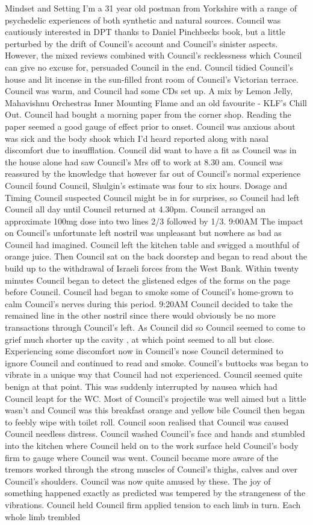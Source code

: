 \documentclass[12pt]{book}
\begin{document}
Mindset and Setting I'm a 31 year old postman from Yorkshire with a range of psychedelic experiences of both synthetic and natural sources. Council was cautiously interested in DPT thanks to Daniel Pinchbecks book, but a little perturbed by the drift of Council's account and Council's sinister aspects. However, the mixed reviews combined with Council's recklessness which Council can give no excuse for, persuaded Council in the end. Council tidied Council's house and lit incense in the sun-filled front room of Council's Victorian terrace. Council was warm, and Council had some CDs set up. A mix by Lemon Jelly, Mahavishnu Orchestras Inner Mounting Flame and an old favourite - KLF's Chill Out. Council had bought a morning paper from the corner shop. Reading the paper seemed a good gauge of effect prior to onset. Council was anxious about was sick and the body shook which I'd heard reported along with nasal discomfort due to insufflation. Council did want to have a fit as Council was in the house alone had saw Council's Mrs off to work at 8.30 am. Council was reassured by the knowledge that however far out of Council's normal experience Council found Council, Shulgin's estimate was four to six hours. Dosage and Timing Council suspected Council might be in for surprises, so Council had left Council all day until Council returned at 4.30pm. Council arranged an approximate 100mg dose into two lines 2/3 followed by 1/3. 9:00AM The impact on Council's unfortunate left nostril was unpleasant but nowhere as bad as Council had imagined. Council left the kitchen table and swigged a mouthful of orange juice. Then Council sat on the back doorstep and began to read about the build up to the withdrawal of Israeli forces from the West Bank. Within twenty minutes Council began to detect the glistened edges of the forms on the page before Council. Council had began to smoke some of Council's home-grown to calm Council's nerves during this period. 9:20AM Council decided to take the remained line in the other nostril since there would obviously be no more transactions through Council's left. As Council did so Council seemed to come to grief much shorter up the cavity , at which point seemed to all but close. Experiencing some discomfort now in Council's nose Council determined to ignore Council and continued to read and smoke. Council's buttocks was began to vibrate in a unique way that Council had not experienced. Council seemed quite benign at that point. This was suddenly interrupted by nausea which had Council leapt for the WC. Most of Council's projectile was well aimed but a little wasn't and Council was this breakfast orange and yellow bile Council then began to feebly wipe with toilet roll. Council soon realised that Council was caused Council needless distress. Council washed Council's face and hands and stumbled into the kitchen where Council held on to the work surface held Council's body firm to gauge where Council was went. Council became more aware of the tremors worked through the strong muscles of Council's thighs, calves and over Council's shoulders. Council was now quite amused by these. The joy of something happened exactly as predicted was tempered by the strangeness of the vibrations. Council held Council firm applied tension to each limb in turn. Each whole limb trembled 
\end{document}
